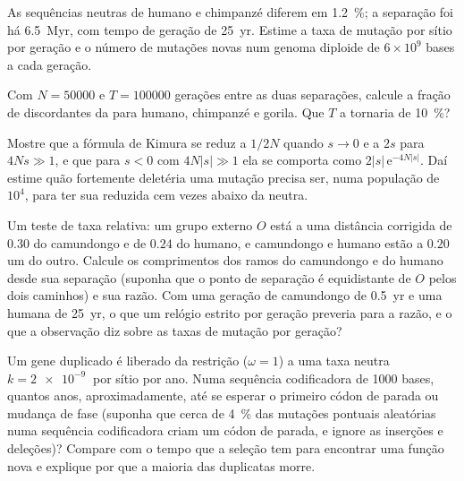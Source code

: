\begin{exercise}[$\star\star$]\label{exo:b3:molecular-evolution:8}
As sequências neutras de humano e chimpanzé diferem em \qty{1.2}{\%}; a
separação foi há \qty{6.5}{Myr}, com tempo de geração de \qty{25}{yr}.
Estime a taxa de mutação por sítio por geração e o número de mutações
novas num genoma diploide de $6\times 10^{9}$ bases a cada geração.
\end{exercise}

\begin{exercise}[$\star\star$]\label{exo:b3:molecular-evolution:9}
Com $N = \num{50000}$ e $T = \num{100000}$ gerações entre as duas
separações, calcule a fração de  discordantes da  para humano, chimpanzé e gorila. Que $T$ a tornaria de
\qty{10}{\%}?
\end{exercise}

\begin{exercise}[$\star\star\star$]\label{exo:b3:molecular-evolution:10}
Mostre que a fórmula de Kimura se reduz a $1/2N$ quando $s \to 0$ e a
$2s$ para $4Ns \gg 1$, e que para $s < 0$ com $4N|s| \gg 1$ ela se
comporta como $2|s|\,\mathrm{e}^{-4N|s|}$. Daí estime quão fortemente
deletéria uma mutação precisa ser, numa população de $10^{4}$, para ter
sua  reduzida cem vezes abaixo da neutra.
\end{exercise}

\begin{exercise}[$\star\star\star$]\label{exo:b3:molecular-evolution:11}
Um teste de taxa relativa: um grupo externo $O$ está a uma distância
corrigida de $0.30$ do camundongo e de $0.24$ do humano, e camundongo e
humano estão a $0.20$ um do outro. Calcule os comprimentos dos ramos do
camundongo e do humano desde sua separação (suponha que o ponto de
separação é equidistante de $O$ pelos dois caminhos) e sua razão. Com uma
geração de camundongo de \qty{0.5}{yr} e uma humana de \qty{25}{yr}, o
que um relógio estrito por geração preveria para a razão, e o que a
observação diz sobre as taxas de mutação por geração?
\end{exercise}

\begin{exercise}[$\star\star\star$]\label{exo:b3:molecular-evolution:12}
Um gene duplicado é liberado da restrição ($\omega = 1$) a uma taxa
neutra $k = \qty{2e-9}{}$ por sítio por ano. Numa sequência codificadora
de 1000 bases, quantos anos, aproximadamente, até se esperar o primeiro
códon de parada ou mudança de fase (suponha que cerca de \qty{4}{\%} das
mutações pontuais aleatórias numa sequência codificadora criam um códon
de parada, e ignore as inserções e deleções)? Compare com o tempo que a
seleção tem para encontrar uma função nova e explique por que a maioria
das duplicatas morre.
\end{exercise}

